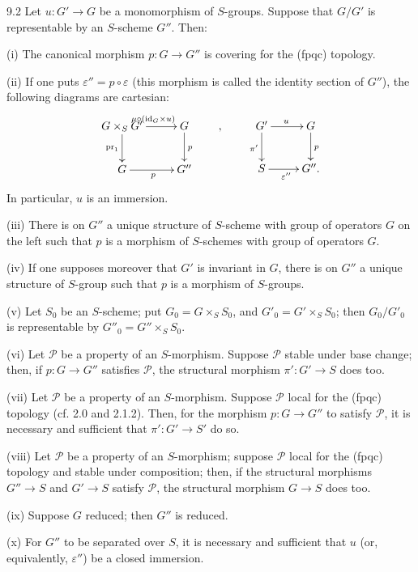 \begin{proposition}{9.2}\label{VIB.9.2}
Let $u:G'\to G$ be a monomorphism of $S$-groups. Suppose that $G/G'$ is representable by an $S$-scheme $G''$. Then:

(i) The canonical morphism $p:G\to G''$ is covering for the (fpqc) topology.

(ii) If one puts $\varepsilon''=p\circ\varepsilon$ (this morphism is called the identity section of $G''$), the following diagrams are cartesian:
\[
\xymatrix{G\times_S G'\ar[r]^{\mu\circ(\mathrm{id}_G\times u)}\ar[d]_{\mathrm{pr}_1}&G\ar[d]^p\\G\ar[r]_p&G''}
\qquad,\qquad
\xymatrix{G'\ar[r]^u\ar[d]_{\pi'}&G\ar[d]^p\\S\ar[r]_{\varepsilon''}&G''.}
\]
In particular, $u$ is an immersion.

(iii) There is on $G''$ a unique structure of $S$-scheme with group of operators $G$ on the left such that $p$ is a morphism of $S$-schemes with group of operators $G$.

(iv) If one supposes moreover that $G'$ is invariant in $G$, there is on $G''$ a unique structure of $S$-group such that $p$ is a morphism of $S$-groups.

(v) Let $S_0$ be an $S$-scheme; put $G_0=G\times_S S_0$, and $G'_0=G'\times_S S_0$; then $G_0/G'_0$ is representable by $G''_0=G''\times_S S_0$.

(vi) Let $\mathscr P$ be a property of an $S$-morphism. Suppose $\mathscr P$ stable under base change; then, if $p:G\to G''$ satisfies $\mathscr P$, the structural morphism $\pi':G'\to S$ does too.

(vii) Let $\mathscr P$ be a property of an $S$-morphism. Suppose $\mathscr P$ local for the (fpqc) topology (cf. 2.0 and 2.1.2). Then, for the morphism $p:G\to G''$ to satisfy $\mathscr P$, it is necessary and sufficient that $\pi':G'\to S'$ do so.

(viii) Let $\mathscr P$ be a property of an $S$-morphism; suppose $\mathscr P$ local for the (fpqc) topology and stable under composition; then, if the structural morphisms $G''\to S$ and $G'\to S$ satisfy $\mathscr P$, the structural morphism $G\to S$ does too.

(ix) Suppose $G$ reduced; then $G''$ is reduced.

(x) For $G''$ to be separated over $S$, it is necessary and sufficient that $u$ (or, equivalently, $\varepsilon''$) be a closed immersion.


\end{proposition}

